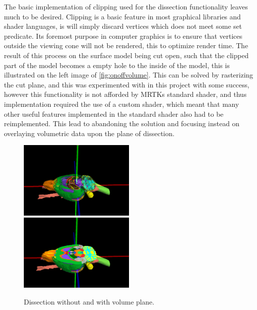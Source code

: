 The basic implementation of clipping used for the dissection functionality leaves much to be desired. Clipping is a basic feature in most graphical libraries and shader languages, is will simply discard vertices which does not meet some set predicate. Its foremost purpose in computer graphics is to ensure that vertices outside the viewing cone will not be rendered, this to optimize render time. The result of this process on the surface model being cut open, such that the clipped part of the model becomes a empty hole to the inside of the model, this is illustrated on the left image of \autoref{fig:onoffvolume}. This can be solved by rasterizing the cut plane, and this was experimented with in this project with some success, however this functionality is not afforded by MRTKs standard shader, and thus implementation required the use of a custom shader, which meant that many other useful features implemented in the standard shader also had to be reimplemented. This lead to abandoning the solution and focusing instead on overlaying volumetric data upon the plane of dissection. 
\begin{figure}[ht]
    \includegraphics[width=0.5\textwidth , trim={3cm 2cm 4cm 5cm}, clip]{fig/top_mrtkdissect2.png}
    \includegraphics[width=0.5\textwidth , trim={3cm 2cm 4cm 5cm}, clip]{fig/top_volumedissect2.png}
    \caption{Dissection without and with volume plane.}
    \label{fig:onoffvolume}
\end{figure}

